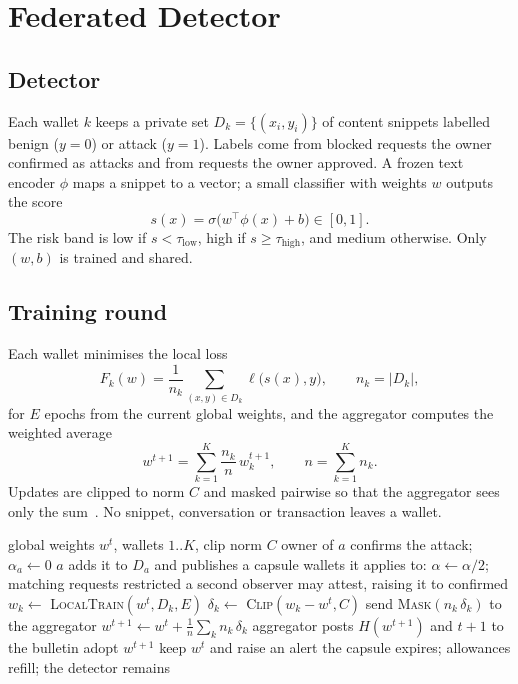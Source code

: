 \documentclass[10pt,a4paper,twocolumn]{article}
\begin{document}
\section{Federated Detector}
\label{sec:fed}

\subsection{Detector}
Each wallet $k$ keeps a private set $D_k=\{(x_i,y_i)\}$ of content snippets labelled
benign ($y=0$) or attack ($y=1$). Labels come from blocked requests the owner confirmed
as attacks and from requests the owner approved. A frozen text encoder $\phi$ maps a
snippet to a vector; a small classifier with weights $w$ outputs the score
\[
s(x)=\sigma\!\big(w^{\top}\phi(x)+b\big)\in[0,1].
\]
The risk band is low if $s<\tau_{\mathrm{low}}$, high if $s\ge\tau_{\mathrm{high}}$, and
medium otherwise. Only $(w,b)$ is trained and shared.

\subsection{Training round}
Each wallet minimises the local loss
\[
F_k(w)=\frac{1}{n_k}\sum_{(x,y)\in D_k}\ell\big(s(x),y\big),\qquad n_k=|D_k|,
\]
for $E$ epochs from the current global weights, and the aggregator computes the weighted
average~\cite{mcmahan}
\[
w^{t+1}=\sum_{k=1}^{K}\frac{n_k}{n}\,w_k^{t+1},\qquad n=\sum_{k=1}^{K}n_k .
\]
Updates are clipped to norm $C$ and masked pairwise so that the aggregator sees only the
sum~\cite{bonawitz}. No snippet, conversation or transaction leaves a wallet.

\begin{algorithm}[t]
\caption{Immunity response to an attack on wallet $a$}
\label{alg:round}
\footnotesize
\begin{algorithmic}[1]
\Require global weights $w^{t}$, wallets $1..K$, clip norm $C$
\State owner of $a$ confirms the attack; $\alpha_a \gets 0$
\State $a$ adds it to $D_a$ and publishes a capsule 
\State wallets it applies to: $\alpha \gets \alpha/2$; matching requests restricted
\State a second observer may attest, raising it to confirmed
 
  \State $w_k \gets$ \textsc{LocalTrain}$(w^{t}, D_k, E)$
  \State $\delta_k \gets$ \textsc{Clip}$(w_k - w^{t}, C)$
  \State send \textsc{Mask}$(n_k\,\delta_k)$ to the aggregator
\EndFor
\State $w^{t+1} \gets w^{t} + \frac{1}{n}\sum_k n_k\,\delta_k$ 
\State aggregator posts $H(w^{t+1})$ and $t{+}1$ to the bulletin
    \State adopt $w^{t+1}$
  \Else
    \State keep $w^{t}$ and raise an alert
  \EndIf
\EndFor
\State the capsule expires; allowances refill; the detector remains
\end{algorithmic}
\end{algorithm}
\end{document}
